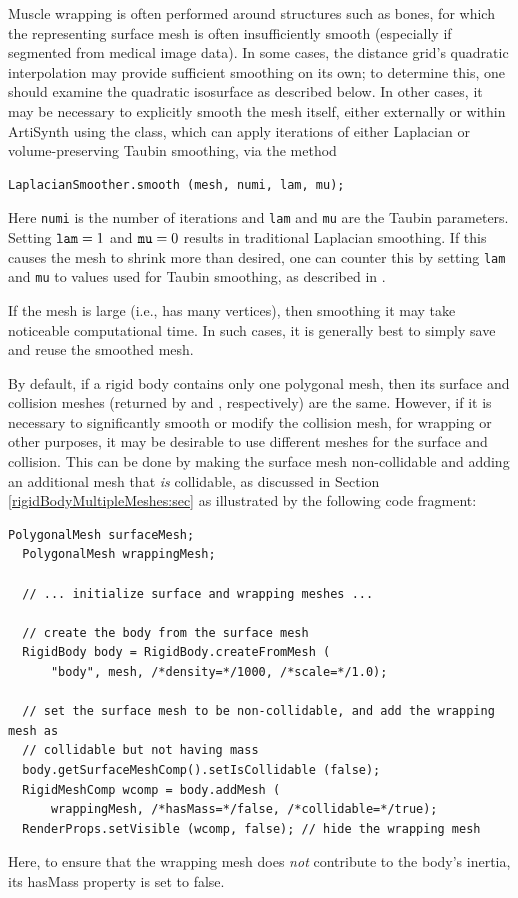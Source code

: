 Muscle wrapping is often performed around structures such as bones,
for which the representing surface mesh is often insufficiently smooth
(especially if segmented from medical image data).  In some cases, the
distance grid's quadratic interpolation may provide sufficient
smoothing on its own; to determine this, one should examine the
quadratic isosurface as described below. In other cases, it may be
necessary to explicitly smooth the mesh itself, either externally or
within ArtiSynth using the  class,
which can apply iterations of either Laplacian or volume-preserving
Taubin smoothing, via the method
%
\begin{lstlisting}[]
  LaplacianSmoother.smooth (mesh, numi, lam, mu);
\end{lstlisting}
%
Here {\tt numi} is the number of iterations and {\tt lam} and {\tt mu}
are the Taubin parameters. Setting ${\tt lam} = 1$ and ${\tt mu} = 0$
results in traditional Laplacian smoothing. If this causes the mesh to
shrink more than desired, one can counter this by setting {\tt lam}
and {\tt mu} to values used for Taubin smoothing, as described in
\cite{taubin1995curve}.

\begin{sideblock}
If the mesh is large (i.e., has many vertices), then smoothing it may
take noticeable computational time. In such cases, it is generally best
to simply save and reuse the smoothed mesh.
\end{sideblock}

By default, if a rigid body contains only one polygonal mesh, then its
surface and collision meshes (returned by
 and
, respectively) are
the same.  However, if it is necessary to significantly smooth or
modify the collision mesh, for wrapping or other purposes, it may be
desirable to use different meshes for the surface and collision. This
can be done by making the surface mesh non-collidable and adding an
additional mesh that {\it is} collidable, as discussed in Section
\ref{rigidBodyMultipleMeshes:sec} as illustrated by the following code
fragment:
%
\begin{lstlisting}[]
  PolygonalMesh surfaceMesh;
  PolygonalMesh wrappingMesh;

  // ... initialize surface and wrapping meshes ...

  // create the body from the surface mesh
  RigidBody body = RigidBody.createFromMesh (
      "body", mesh, /*density=*/1000, /*scale=*/1.0);

  // set the surface mesh to be non-collidable, and add the wrapping mesh as
  // collidable but not having mass
  body.getSurfaceMeshComp().setIsCollidable (false);
  RigidMeshComp wcomp = body.addMesh (
      wrappingMesh, /*hasMass=*/false, /*collidable=*/true);
  RenderProps.setVisible (wcomp, false); // hide the wrapping mesh
\end{lstlisting}
%
Here, to ensure that the wrapping mesh does {\it not} contribute to
the body's inertia, its {\sf hasMass} property is set to false.

